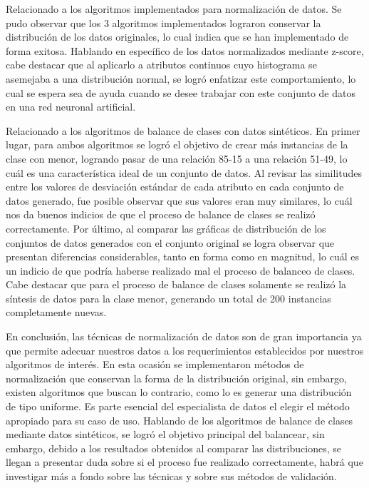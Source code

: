 Relacionado a los algoritmos implementados para normalización de datos. Se pudo observar que los 3 algoritmos implementados lograron conservar la distribución de los datos originales, lo cual indica que se han implementado de forma exitosa. Hablando en específico de los datos normalizados mediante z-score, cabe destacar que al aplicarlo a atributos continuos cuyo histograma se asemejaba a una distribución normal, se logró enfatizar este comportamiento, lo cual se espera sea de ayuda cuando se desee trabajar con este conjunto de datos en una red neuronal artificial.

Relacionado a los algoritmos de balance de clases con datos sintéticos. En primer lugar, para ambos algoritmos se logró el objetivo de crear más instancias de la clase con menor, logrando pasar de una relación 85-15 a una relación 51-49, lo cuál es una característica ideal de un conjunto de datos. Al revisar las similitudes entre los valores de desviación estándar de cada atributo en cada conjunto de datos generado, fue posible observar que sus valores eran muy similares, lo cuál nos da buenos indicios de que el proceso de balance de clases se realizó correctamente. Por último, al comparar las gráficas de distribución de los conjuntos de datos generados con el conjunto original se logra observar que presentan diferencias considerables, tanto en forma como en magnitud, lo cuál es un indicio de que podría haberse realizado mal el proceso de balanceo de clases. Cabe destacar que para el proceso de balance de clases solamente se realizó la síntesis de datos para la clase menor, generando un total de 200 instancias completamente nuevas.

En conclusión, las técnicas de normalización de datos son de gran importancia ya que permite adecuar nuestros datos a los requerimientos establecidos por nuestros algoritmos de interés. En esta ocasión se implementaron métodos de normalización que conservan la forma de la distribución original, sin embargo, existen algoritmos que buscan lo contrario, como lo es generar una distribución de tipo uniforme. Es parte esencial del especialista de datos el elegir el método apropiado para su caso de uso. Hablando de los algoritmos de balance de clases mediante datos sintéticos, se logró el objetivo principal del balancear, sin embargo, debido a los resultados obtenidos al comparar las distribuciones, se llegan a presentar duda sobre si el proceso fue realizado correctamente, habrá que investigar más a fondo sobre las técnicas y sobre sus métodos de validación.


